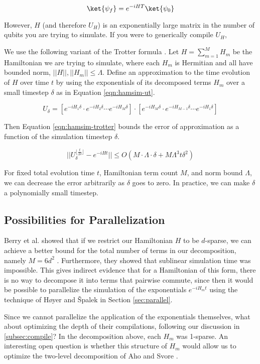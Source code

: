 \begin{displaymath}
\ket{\psi_f} = e^{-iHT} \ket{\psi_0}
\end{displaymath}

However, $H$ (and therefore $U_H$)
is an exponentially large matrix in the number of qubits you
are trying to simulate. If you were to generically compile $U_H$, 

We use the following variant of the Trotter formula \cite{Aharonov2003}.
Let $H = \sum_{m=1}^M H_m$ be the Hamiltonian we are trying to simulate, where
each $H_m$ is Hermitian and all have bounded norm, $||H||,||H_m|| \le \Lambda$.
Define an approximation to the time evolution of $H$ over time $t$ by using the
exponentials of its decomposed terms $H_m$ over a small
timestep $\delta$ as in Equation
\ref{eqn:hamsim-ut}.

\begin{equation}
U_\delta = [e^{-iH_1 \delta}\cdot e^{-iH_2 \delta} \cdots e^{-iH_M \delta}]\cdot
      [e^{-iH_M \delta}\cdot e^{-iH_{M-1} \delta} \cdots e^{-iH_1 \delta}]
\label{eqn:hamsim-ut}
\end{equation}

Then Equation \ref{eqn:hamsim-trotter} bounds the error of approximation
as a function of the simulation timestep $\delta$.

\begin{equation}
||U_{\delta}^{\lfloor \frac{t}{2\delta} \rfloor} - e^{-iHt}||
\le O(M\cdot\Lambda \cdot \delta + M\Lambda^3 t \delta^2)
\label{eqn:hamsim-trotter}
\end{equation}

For fixed total evolution time $t$, Hamiltonian term count $M$,
and norm bound $\Lambda$, we can decrease the error arbitrarily as
$\delta$ goes to zero. In practice, we can make $\delta$ a polynomially
small timestep.

\subsection{Possibilities for Parallelization}

Berry et al. showed that if we restrict our Hamiltonian $H$ to be
$d$-sparse, we can achieve a better bound for the total
number of terms in our decomposition, namely $M=6d^2$ \cite{Berry2005}.
Furthermore, they showed that sublinear simulation time was impossible.
This gives indirect evidence that for a Hamiltonian of this form,
there is no way to decompose it into terms that pairwise commute, since then
it would be possible to parallelize the simulation of the
exponentials $e^{-iH_m t}$ using
the technique of H{\o}yer and {\v S}palek in
Section \ref{sec:parallel}.

Since we cannot parallelize the application of the exponentials themselves,
what about optimizing the depth of their compilations, following our
discussion in \ref{subsec:compile}? In the decomposition above, each $H_m$
was 1-sparse. An interesting open question is whether this structure of
$H_m$ would allow us to optimize the two-level decomposition of
Aho and Svore \cite{Aho2003}.